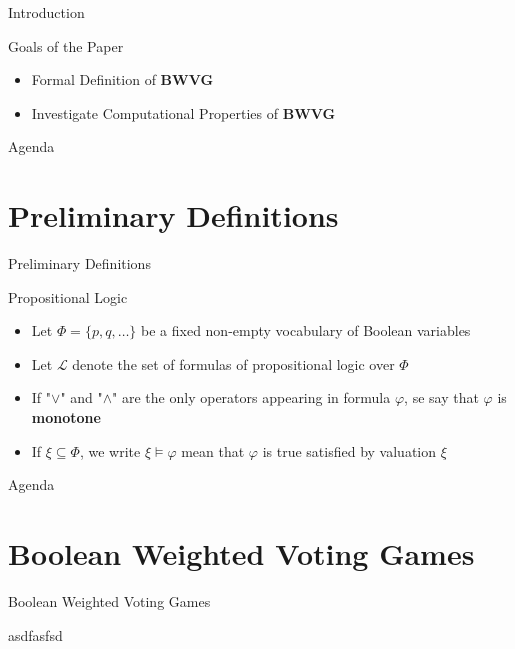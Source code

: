 \documentclass{beamer}
\begin{document}
\begin{frame}[fragile]{Introduction}
  \begin{block}{Goals of the Paper}
    \begin{itemize}
      \item Formal Definition of \textbf{BWVG}
      \item Investigate Computational Properties of \textbf{BWVG}
    \end{itemize}
  \end{block}
\end{frame}

\begin{frame}[fragile]{Agenda}
  \section{Preliminary Definitions}
  \tableofcontents[currentsection]
\end{frame}

\begin{frame}[fragile]{Preliminary Definitions}
  \begin{block}{Propositional Logic}
    \begin{itemize}
      \item Let $\Phi = \{p,q,\dots\}$ be a fixed non-empty vocabulary of Boolean variables    
      \item Let $\mathcal{L}$ denote the set of formulas of propositional logic over $\Phi$
      \item If "$\lor$" and "$\land$" are the only operators appearing in formula $\varphi$, se say that $\varphi$ is \textbf{monotone}
      \item If $\xi \subseteq \Phi$, we write $\xi \models \varphi$ mean that $\varphi$ is true satisfied by valuation $\xi$
    \end{itemize}
  \end{block}
\end{frame}

\begin{frame}[fragile]{Agenda}
  \section{Boolean Weighted Voting Games}
  \tableofcontents[currentsection]
\end{frame}

\begin{frame}[fragile]{Boolean Weighted Voting Games}
  \begin{block}{}
    asdfasfsd
  \end{block}
\end{frame}
\end{document}
